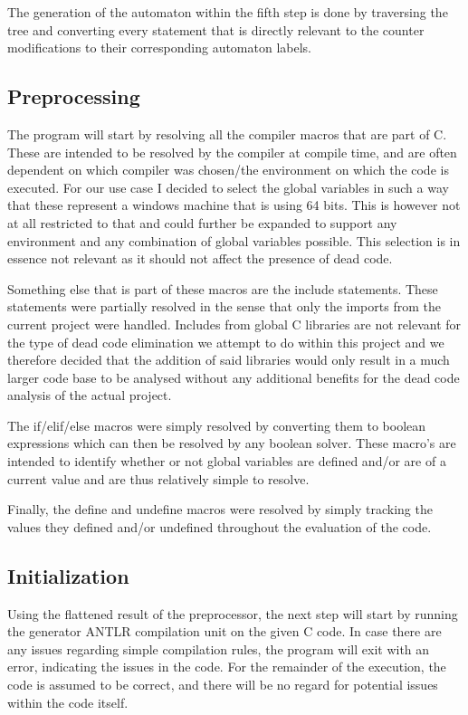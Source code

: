 \documentclass[12pt]{article}
\begin{document}
The generation of the automaton within the fifth step is done by traversing the tree and converting every statement that is directly relevant to the counter modifications to their corresponding automaton labels.

\subsection{Preprocessing}
\label{sec:conversion}
The program will start by resolving all the compiler macros that are part of C. These are intended to be resolved by the compiler at compile time, and are often dependent on which compiler was chosen/the environment on which the code is executed. For our use case I decided to select the global variables in such a way that these represent a windows machine that is using 64 bits. This is however not at all restricted to that and could further be expanded to support any environment and any combination of global variables possible. This selection is in essence not relevant as it should not affect the presence of dead code.

Something else that is part of these macros are the include statements. These statements were partially resolved in the sense that only the imports from the current project were handled. Includes from global C libraries are not relevant for the type of dead code elimination we attempt to do within this project and we therefore decided that the addition of said libraries would only result in a much larger code base to be analysed without any additional benefits for the dead code analysis of the actual project.

The if/elif/else macros were simply resolved by converting them to boolean expressions which can then be resolved by any boolean solver. These macro's are intended to identify whether or not global variables are defined and/or are of a current value and are thus relatively simple to resolve.

Finally, the define and undefine macros were resolved by simply tracking the values they defined and/or undefined throughout the evaluation of the code. 

\subsection{Initialization}
Using the flattened result of the preprocessor, the next step will start by running the generator ANTLR compilation unit on the given C code. In case there are any issues regarding simple compilation rules, the program will exit with an error, indicating the issues in the code. For the remainder of the execution, the code is assumed to be correct, and there will be no regard for potential issues within the code itself.
\end{document}
